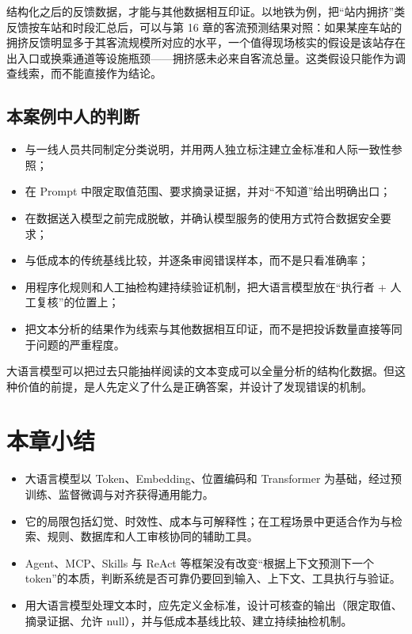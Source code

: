 结构化之后的反馈数据，才能与其他数据相互印证。以地铁为例，把“站内拥挤”类反馈按车站和时段汇总后，可以与第 16 章的客流预测结果对照：如果某座车站的拥挤反馈明显多于其客流规模所对应的水平，一个值得现场核实的假设是该站存在出入口或换乘通道等设施瓶颈——拥挤感未必来自客流总量。这类假设只能作为调查线索，而不能直接作为结论。

\subsection{本案例中人的判断}

\begin{itemize}
  \item 与一线人员共同制定分类说明，并用两人独立标注建立金标准和人际一致性参照；
  \item 在 Prompt 中限定取值范围、要求摘录证据，并对“不知道”给出明确出口；
  \item 在数据送入模型之前完成脱敏，并确认模型服务的使用方式符合数据安全要求；
  \item 与低成本的传统基线比较，并逐条审阅错误样本，而不是只看准确率；
  \item 用程序化规则和人工抽检构建持续验证机制，把大语言模型放在“执行者 + 人工复核”的位置上；
  \item 把文本分析的结果作为线索与其他数据相互印证，而不是把投诉数量直接等同于问题的严重程度。
\end{itemize}

大语言模型可以把过去只能抽样阅读的文本变成可以全量分析的结构化数据。但这种价值的前提，是人先定义了什么是正确答案，并设计了发现错误的机制。

\section{本章小结}

\begin{itemize}
  \item 大语言模型以 Token、Embedding、位置编码和 Transformer 为基础，经过预训练、监督微调与对齐获得通用能力。
  \item 它的局限包括幻觉、时效性、成本与可解释性；在工程场景中更适合作为与检索、规则、数据库和人工审核协同的辅助工具。
  \item Agent、MCP、Skills 与 ReAct 等框架没有改变“根据上下文预测下一个 token”的本质，判断系统是否可靠仍要回到输入、上下文、工具执行与验证。
  \item 用大语言模型处理文本时，应先定义金标准，设计可核查的输出（限定取值、摘录证据、允许 null），并与低成本基线比较、建立持续抽检机制。
\end{itemize}

